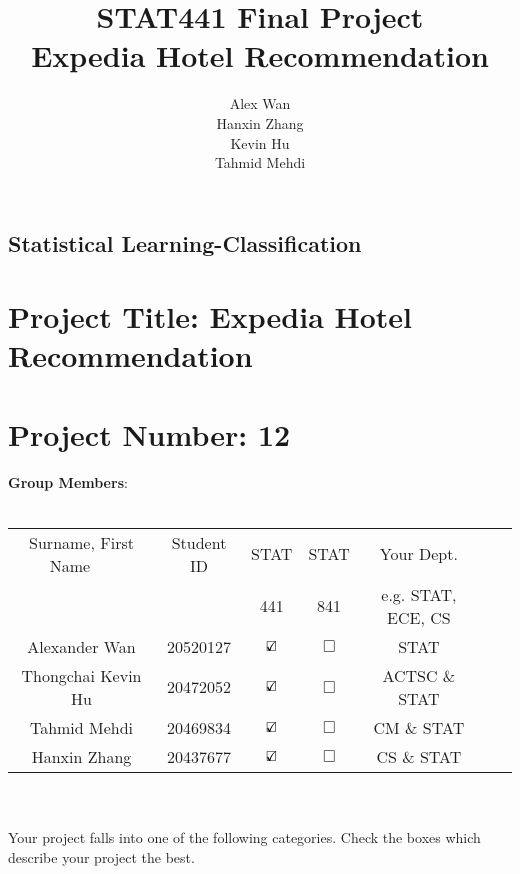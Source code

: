 \documentclass[12pt]{report}
\title{STAT441 Final Project \\ \large Expedia Hotel Recommendation}
\author{Alex Wan \\ Hanxin Zhang \\ Kevin Hu \\ Tahmid Mehdi}
\begin{document}
\thispagestyle{empty}

\begin{center}
\section*{Statistical Learning-Classification}
\end{center}




\section*{Project Title: Expedia Hotel Recommendation}
\section*{Project Number: 12}

{\large \textbf{Group Members}:}\\\\
\begin{tabular}{|c|c||c| c| c| c|c|}
  \hline
Surname, First Name $~~~~~$& Student ID   & STAT    & STAT &  Your Dept. \\
 $~~~~~$& & 441  & 841 &  e.g. STAT, ECE, CS\\
  \hline \hline
Alexander Wan   & 20520127 & $\text{\rlap{$\checkmark$}}\square$     &   $\Box$& STAT \\\hline
Thongchai Kevin Hu   & 20472052 & $\text{\rlap{$\checkmark$}}\square$       &  $\Box$& ACTSC \& STAT\\ \hline
Tahmid Mehdi & 20469834 & $\text{\rlap{$\checkmark$}}\square$     &  $\Box$& CM \& STAT\\ \hline
Hanxin Zhang   & 20437677  & $\text{\rlap{$\checkmark$}}\square$     &  $\Box$& CS \& STAT\\ \hline
\end{tabular}\\\\

  
Your project falls into one of the following categories. Check the
boxes which describe your project the best.
\end{document}
